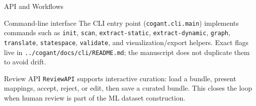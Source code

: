 \documentclass[
  ignorenonframetext,
]{beamer}
\begin{document}
\begin{frame}[fragile]{API and Workflows}
\begin{block}{Command-line interface}
\protect{}\label{command-line-interface}
The CLI entry point (\texttt{cogant.cli.main}) implements commands such
as \texttt{init}, \texttt{scan}, \texttt{extract-static},
\texttt{extract-dynamic}, \texttt{graph}, \texttt{translate},
\texttt{statespace}, \texttt{validate}, and visualization/export
helpers. Exact flags live in \texttt{../cogant/docs/cli/README.md}; the
manuscript does not duplicate them to avoid drift.
\end{block}

\begin{block}{Review API}
\protect{}\label{review-api}
\texttt{ReviewAPI} supports interactive curation: load a bundle, present
mappings, accept, reject, or edit, then save a curated bundle. This
closes the loop when human review is part of the ML dataset
construction.
\end{block}
\end{frame}
\end{document}

